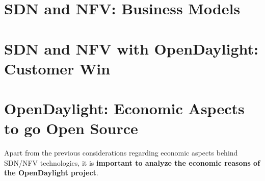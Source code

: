 \documentclass[a4paper, 12pt]{book}
\begin{document}
\section{SDN and NFV: Business Models}
\label{sec:odlbusinessmodels}

\section{SDN and NFV with OpenDaylight: Customer Win}
\label{sec:odlbusinessmodels}

\section{OpenDaylight: Economic Aspects to go Open Source}
\label{sec:odlopensource}
Apart from the previous considerations regarding economic aspects behind SDN/NFV technologies, it is \textbf{important to analyze the economic reasons of the OpenDaylight project}.
\end{document}
